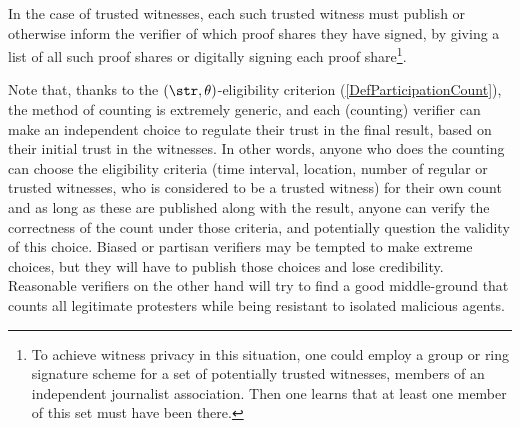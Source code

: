 

In the case of trusted witnesses, each such trusted witness must
publish or otherwise inform the verifier of which proof shares they
have signed, \eg by giving a list of all such proof shares or
digitally signing each proof share\footnote{%
  To achieve witness privacy in this situation, one could employ a
  group or ring signature scheme for a set of potentially trusted witnesses, \eg
  members of an independent journalist association.  Then one learns
  that at least one member of this set must have
  been there.
}.

Note that, thanks to the \((\str,\theta)\)-eligibility criterion
(\cref{DefParticipationCount}), the method of counting is extremely
generic, and each (counting) verifier can make an independent choice to regulate their trust in the final result, based on their initial trust in the witnesses. In other words, anyone who does the counting can choose the eligibility
criteria (time interval, location, number of regular or trusted
witnesses, who is considered to be a trusted witness) for their own count
and as long as these are published along with the result, anyone can
verify the correctness of the count under those criteria, and potentially question the validity of this choice. Biased or partisan verifiers may be tempted to make extreme choices, but they will have to publish those choices and lose credibility. Reasonable verifiers on the other hand will try to find a good middle-ground that counts all legitimate protesters while being resistant to isolated malicious agents.

